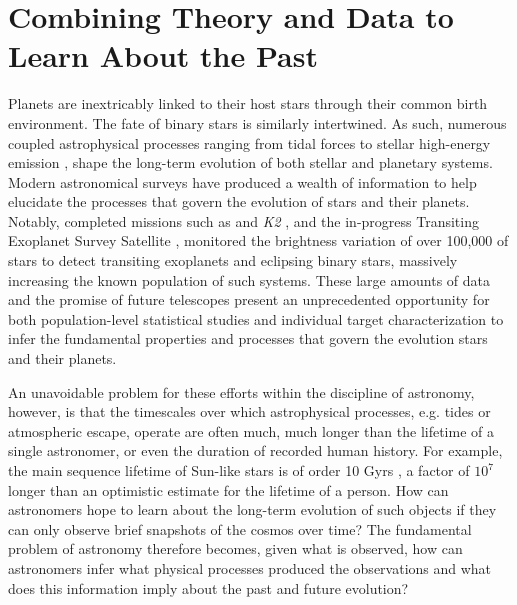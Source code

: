 
\section{Combining Theory and Data to Learn About the Past}

Planets are inextricably linked to their host stars through their common birth environment. The fate of binary stars is similarly intertwined.  As such, numerous coupled astrophysical processes ranging from tidal forces \citep{Zahn1989,Barnes2017} to stellar high-energy emission \citep{Airapetian2019}, shape the long-term evolution of both stellar and planetary systems. Modern astronomical surveys have produced a wealth of information to help elucidate the processes that govern the evolution of stars and their planets. Notably, completed missions such as \kepler \citep{Borucki2003,Borucki2010} and \textit{K2} \citep{Howell2014}, and the in-progress Transiting Exoplanet Survey Satellite \citep[TESS, ][]{Ricker2014}, monitored the brightness variation of over 100,000 of stars to detect transiting exoplanets and eclipsing binary stars, massively increasing the known population of such systems.  These large amounts of data and the promise of future telescopes present an unprecedented opportunity for both population-level statistical studies and individual target characterization to infer the fundamental properties and processes that govern the evolution stars and their planets.

An unavoidable problem for these efforts within the discipline of astronomy, however, is that the timescales over which astrophysical processes, e.g. tides or atmospheric escape, operate are often much, much longer than the lifetime of a single astronomer, or even the duration of recorded human history. For example, the main sequence lifetime of Sun-like stars is of order 10 Gyrs \citep{Baraffe2015}, a factor of $10^7$ longer than an optimistic estimate for the lifetime of a person. How can astronomers hope to learn about the long-term evolution of such objects if they can only observe brief snapshots of the cosmos over time? The fundamental problem of astronomy therefore becomes, given what is observed, how can astronomers infer what physical processes produced the observations and what does this information imply about the past and future evolution? 

